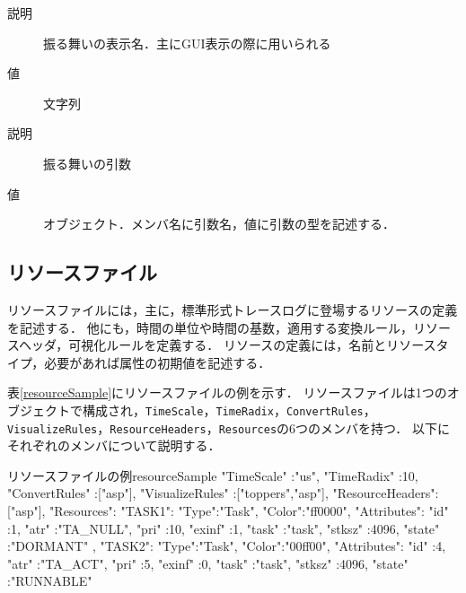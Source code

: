 \begin{description}
\begin{description}
            \begin{description}
            \setlength{\itemsep}{-1.5\itemsep}
            {\nopagebreak
            \item[\texttt{DisplayName}] \mbox{}
            \vspace{-0.25zw}
                \begin{description}
                \item[説明] 振る舞いの表示名．主にGUI表示の際に用いられる
                \item[値] 文字列
                \end{description}
            }{\nopagebreak
            \item[\texttt{Arguments}] \mbox{}
            \vspace{-0.25zw}
                \begin{description}
                \item[説明] 振る舞いの引数
                \item[値] オブジェクト．メンバ名に引数名，値に引数の型を記述する．
                \end{description}
            }
            \end{description}
    \end{description}
\end{description}

\subsection{リソースファイル}
\label{subsec:resFile}

リソースファイルには，主に，標準形式トレースログに登場するリソースの定義を記述する．
他にも，時間の単位や時間の基数，適用する変換ルール，リソースヘッダ，可視化ルールを定義する．
リソースの定義には，名前とリソースタイプ，必要があれば属性の初期値を記述する．

表\ref{resourceSample}にリソースファイルの例を示す．
リソースファイルは1つのオブジェクトで構成され，\verb|TimeScale|，\verb|TimeRadix|，\verb|ConvertRules|，\verb|VisualizeRules|，\verb|ResourceHeaders|，\verb|Resources|の6つのメンバを持つ．
以下にそれぞれのメンバについて説明する．

\begin{FileHere}{リソースファイルの例}{resourceSample}
{
  "TimeScale" :"us",
  "TimeRadix" :10,
  "ConvertRules"   :["asp"],
  "VisualizeRules" :["toppers","asp"],
  "ResourceHeaders":["asp"],
  "Resources":{
    "TASK1":{
      "Type":"Task",
      "Color":"ff0000",
      "Attributes":{
        "id"    :1,
        "atr"   :"TA_NULL",
        "pri"   :10,
        "exinf" :1,
        "task"  :"task",
        "stksz" :4096,
        "state" :"DORMANT"
      }
    },
    "TASK2":{
      "Type":"Task",
      "Color":"00ff00",
      "Attributes":{
        "id"    :4,
        "atr"   :"TA_ACT",
        "pri"   :5,
        "exinf" :0,
        "task"  :"task",
        "stksz" :4096,
        "state" :"RUNNABLE"
      }
    }
  }
}
\end{FileHere}


